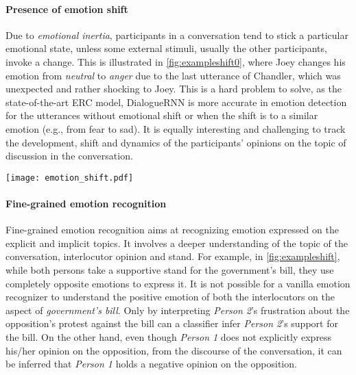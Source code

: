 \documentclass{IEEEtran}\usepackage[pdftex]{graphicx}
\begin{document}
	\paragraph{Presence of emotion shift}
	
	Due to \textit{emotional inertia}, participants in a conversation tend to stick a particular emotional state, unless
	some external stimuli, usually the other participants, invoke a change. This is illustrated in \cref{fig:exampleshift0}, where Joey
	changes his emotion from \textit{neutral} to \textit{anger} due to the last utterance of Chandler, which was unexpected and rather shocking to Joey. This is a hard problem
	to solve, as the state-of-the-art ERC model, DialogueRNN is more accurate in emotion detection for the utterances without emotional shift or when the shift is to a similar emotion (e.g., from fear to sad). It is equally interesting and challenging to track the development, shift and dynamics of the participants' opinions on the topic of discussion in the conversation.
	
	\begin{figure*}[h] 
		\centering 
		\small
		\texttt{[image: emotion\_shift.pdf]}
		\caption{ 
			Emotion shift of speakers in a dialogue in comparison with speaker’s previous emotion. Red
			and blue colors are used to show the emotion shift of Joey and Chandler respectively..}
		\label{fig:exampleshift0}
	\end{figure*}
	
	\paragraph{Fine-grained emotion recognition}
	Fine-grained emotion recognition aims at recognizing emotion expressed on the explicit and implicit topics. It involves a deeper understanding of the topic of the conversation, interlocutor opinion and stand. For example, in 
	\cref{fig:exampleshift}, while both persons take a supportive stand for the government's bill, they use completely opposite emotions to express it. It is not possible for a vanilla emotion recognizer to understand the positive emotion of both the interlocutors on the aspect of \emph{government's bill}. Only by interpreting {\it Person 2}'s frustration about the opposition's protest against the bill can a classifier infer {\it Person 2}'s support for the bill. On the other hand, even though {\it Person 1} does not explicitly express his/her opinion on the opposition, from the discourse of the conversation, it can be inferred that {\it Person 1} holds a negative opinion on the opposition.
	
\end{document}
